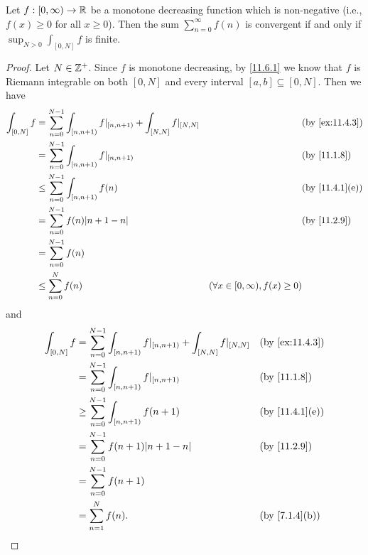 \begin{prop}\label{11.6.4}
  Let \(f : [0, \infty) \to \mathbb{R}\) be a monotone decreasing function which is non-negative
  (i.e., \(f(x) \geq 0\) for all \(x \geq 0\)).
  Then the sum \(\sum_{n = 0}^\infty f(n)\) is convergent if and only if \(\sup_{N > 0} \int_{[0, N]} f\) is finite.
\end{prop}

\begin{proof}
  Let \(N \in \mathbb{Z}^+\).
  Since \(f\) is monotone decreasing, by \cref{11.6.1} we know that \(f\) is Riemann integrable on both \([0, N]\) and every interval \([a, b] \subseteq [0, N]\).
  Then we have
  \begin{align*}
    \int_{[0, N]} f & = \sum_{n = 0}^{N - 1} \int_{[n, n + 1)} f|_{[n, n + 1)} + \int_{[N, N]} f|_{[N, N]} &                                          & \by{ex:11.4.3}               \\
                    & = \sum_{n = 0}^{N - 1} \int_{[n, n + 1)} f|_{[n, n + 1)}                             &                                          & \by{11.1.8}                  \\
                    & \leq \sum_{n = 0}^{N - 1} \int_{[n, n + 1)} f(n)                                     &                                          & \text{(by \cref{11.4.1}(e))} \\
                    & = \sum_{n = 0}^{N - 1} f(n) \abs{n + 1 - n}                                          &                                          & \by{11.2.9}                  \\
                    & = \sum_{n = 0}^{N - 1} f(n)                                                                                                                                    \\
                    & \leq \sum_{n = 0}^N f(n)                                                             & (\forall x \in [0, \infty), f(x) \geq 0)
  \end{align*}
  and
  \begin{align*}
    \int_{[0, N]} f & = \sum_{n = 0}^{N - 1} \int_{[n, n + 1)} f|_{[n, n + 1)} + \int_{[N, N]} f|_{[N, N]} &  & \by{ex:11.4.3}               \\
                    & = \sum_{n = 0}^{N - 1} \int_{[n, n + 1)} f|_{[n, n + 1)}                             &  & \by{11.1.8}                  \\
                    & \geq \sum_{n = 0}^{N - 1} \int_{[n, n + 1)} f(n + 1)                                 &  & \text{(by \cref{11.4.1}(e))} \\
                    & = \sum_{n = 0}^{N - 1} f(n + 1) \abs{n + 1 - n}                                      &  & \by{11.2.9}                  \\
                    & = \sum_{n = 0}^{N - 1} f(n + 1)                                                                                        \\
                    & = \sum_{n = 1}^N f(n).                                                               &  & \text{(by \cref{7.1.4}(b))}
  \end{align*}


\end{proof}
